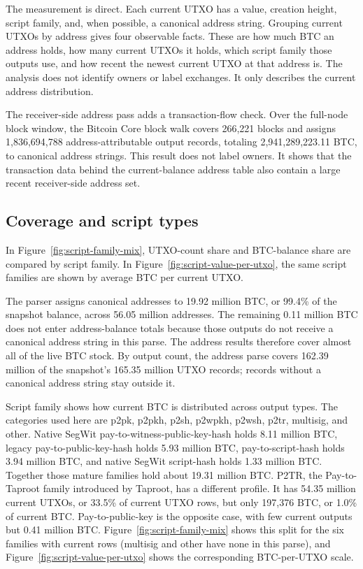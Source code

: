 \documentclass[conference]{IEEEtran}
\begin{document}
The measurement is direct. Each current UTXO has a value, creation height,
script family, and, when possible, a canonical address string. Grouping
current UTXOs by address gives four observable facts. These are how much BTC an
address holds, how many current UTXOs it holds, which script family those
outputs use, and how recent the newest current UTXO at that address is. The
analysis does not identify owners or label exchanges. It only describes the
current address distribution.


The receiver-side address pass adds a transaction-flow check. Over the
full-node block window, the Bitcoin Core block walk covers 266,221 blocks
and assigns 1,836,694,788 address-attributable output records, totaling
2,941,289,223.11 BTC, to canonical address strings. This result does not
label owners. It shows that the transaction data behind the current-balance
address table also contain a large recent receiver-side address set.

\subsection{Coverage and script types}

In Figure~\ref{fig:script-family-mix}, UTXO-count share and
BTC-balance share are compared by script family. In
Figure~\ref{fig:script-value-per-utxo}, the same script families are
shown by average BTC per current UTXO.

The parser assigns canonical addresses to 19.92 million BTC, or 99.4\% of
the snapshot balance, across 56.05 million addresses. The remaining
0.11 million BTC does not enter address-balance totals because those
outputs do not receive a canonical address string in this parse. The
address results therefore cover almost all of the live BTC stock. By output
count, the address parse covers 162.39 million of the snapshot's
165.35 million UTXO records; records without a canonical address string stay
outside it.

Script family shows how current BTC is distributed across output types. The
categories used here are p2pk, p2pkh, p2sh, p2wpkh, p2wsh, p2tr, multisig,
and other. Native SegWit pay-to-witness-public-key-hash holds 8.11 million
BTC, legacy pay-to-public-key-hash holds 5.93 million BTC,
pay-to-script-hash holds 3.94 million BTC, and native SegWit script-hash
holds 1.33 million BTC. Together those mature families hold about
19.31 million BTC. P2TR, the Pay-to-Taproot family introduced by Taproot,
has a different profile. It has 54.35 million current UTXOs, or 33.5\% of current UTXO
rows, but only 197{,}376 BTC, or 1.0\% of current BTC.
Pay-to-public-key is the opposite case, with few current outputs but
0.41 million BTC. Figure~\ref{fig:script-family-mix} shows this split for
the six families with current rows (multisig and other have none in this
parse), and Figure~\ref{fig:script-value-per-utxo} shows the corresponding
BTC-per-UTXO scale.
\end{document}
